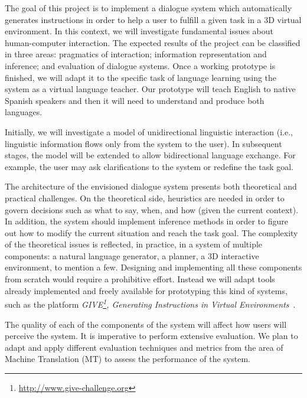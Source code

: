 
The goal of this project is to implement a dialogue system which automatically
generates instructions in order to help a user to fulfill a
given task in a 3D virtual environment. In this context, we will investigate
fundamental issues about human-computer interaction. The expected results of the
project can be classified in three areas: pragmatics
of interaction;  information representation and inference; and evaluation of
dialogue systems. Once a working prototype is finished, we will adapt it to
the specific task of language learning using the system as a virtual language
teacher. Our prototype will teach English to native Spanish speakers and then it
will need to understand and produce both languages.

Initially, we will investigate a model of unidirectional linguistic
interaction (i.e., linguistic information flows only from the system to the
user). In subsequent stages, the model will be
extended to allow bidirectional language exchange. For example, the user may
ask clarifications to the system or redefine the task goal.

The architecture of the envisioned dialogue system presents both theoretical and
practical challenges. On the theoretical side, heuristics are needed in order to
govern
decisions such as what to say, when, and how (given the current
context). In addition, the system should implement inference methods in order
to figure out how to modify the current situation and reach the task goal.
The complexity of
the theoretical issues is reflected, in practice, in a system of
multiple components: a natural language generator, a planner,
a 3D interactive environment, to mention a few. Designing
and implementing all these components from scratch would 
require a prohibitive effort. Instead we will adapt tools already implemented 
and freely available for prototyping this kind of 
systems, such as the platform
\emph{GIVE\footnote{\url{http://www.give-challenge.org}}, Generating
Instructions in Virtual
Environments}~\cite{byron09}. 

The quality of each of the components of the system will affect how
users will perceive the system. It is imperative to perform extensive
evaluation. 
We plan to adapt and apply different evaluation techniques and
metrics from the area of Machine Translation (MT) to assess the  
performance of the system.

